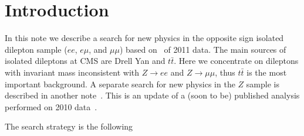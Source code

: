 \section{Introduction}
\label{sec:intro}

In this note we describe a search for new physics in the
opposite sign isolated dilepton sample ($ee$, $e\mu$, and $\mu\mu$)
based on \lumi\ of 2011 data.
The main sources of 
isolated dileptons at CMS are Drell Yan and $t\bar{t}$.
Here we concentrate on dileptons with invariant mass inconsistent
with $Z \to ee$ and $Z \to \mu\mu$, thus $t\bar{t}$ is the most
important background.  A separate search for new physics in the $Z$ 
sample is described in another note~\cite{ref:Ztemplates}.
This is an update of a (soon to be) published analysis performed 
on 2010 data~\cite{ref:osnote,ref:ospaper}. 

The search strategy is the following

